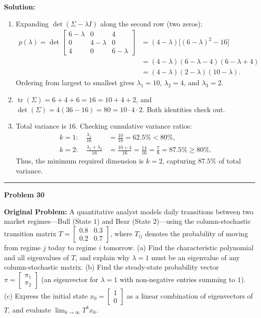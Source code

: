 \documentclass[11pt, letterpaper]{article}
\theoremstyle{definition}
\theoremstyle{remark}
\begin{document}
\textbf{Solution:}
\begin{enumerate}[label=(\alph*), topsep=3pt, itemsep=4pt]
    \item Expanding $\det(\Sigma - \lambda I)$ along the second row (two zeros):
    \begin{align*}
    p(\lambda) = \det\begin{bmatrix} 6 - \lambda & 0 & 4 \\ 0 & 4 - \lambda & 0 \\ 4 & 0 & 6 - \lambda \end{bmatrix} &= (4 - \lambda)\big[(6 - \lambda)^2 - 16\big] \\
    &= (4 - \lambda)(6 - \lambda - 4)(6 - \lambda + 4) \\
    &= (4 - \lambda)(2 - \lambda)(10 - \lambda).
    \end{align*}
    Ordering from largest to smallest gives $\lambda_1 = 10$, $\lambda_2 = 4$, and $\lambda_3 = 2$.
    \item $\operatorname{tr}(\Sigma) = 6 + 4 + 6 = 16 = 10 + 4 + 2$, and $\det(\Sigma) = 4(36 - 16) = 80 = 10 \cdot 4 \cdot 2$. Both identities check out.
    \item Total variance is $16$. Checking cumulative variance ratios:
    \begin{align*}
    k = 1: \quad \frac{\lambda_1}{16} &= \frac{10}{16} = 62.5\% < 80\%, \\
    k = 2: \quad \frac{\lambda_1 + \lambda_2}{16} &= \frac{10 + 4}{16} = \frac{14}{16} = \frac{7}{8} = 87.5\% \ge 80\%.
    \end{align*}
    Thus, the minimum required dimension is $k = 2$, capturing $87.5\%$ of total variance.
\end{enumerate}

\noindent\rule{\textwidth}{0.4pt}

\noindent\textbf{Problem 30}

\textbf{Original Problem:} A quantitative analyst models daily transitions between two market regimes—Bull (State $1$) and Bear (State $2$)—using the column-stochastic transition matrix $T = \begin{bmatrix} 0.8 & 0.3 \\ 0.2 & 0.7 \end{bmatrix}$, where $T_{ij}$ denotes the probability of moving from regime $j$ today to regime $i$ tomorrow. (a) Find the characteristic polynomial and all eigenvalues of $T$, and explain why $\lambda = 1$ must be an eigenvalue of any column-stochastic matrix. (b) Find the steady-state probability vector $\pi = \begin{bmatrix} \pi_1 \\ \pi_2 \end{bmatrix}$ (an eigenvector for $\lambda = 1$ with non-negative entries summing to $1$). (c) Express the initial state $x_0 = \begin{bmatrix} 1 \\ 0 \end{bmatrix}$ as a linear combination of eigenvectors of $T$, and evaluate $\lim_{k \to \infty} T^k x_0$.
\end{document}
